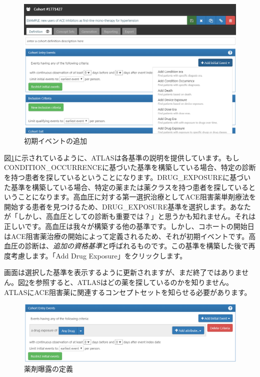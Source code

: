 \documentclass[
  11pt]{book}
\theoremstyle{definition}
\theoremstyle{definition}
\theoremstyle{definition}
\theoremstyle{definition}
\theoremstyle{remark}
\begin{document}
\begin{figure}

{\centering \includegraphics[width=1\linewidth]{images/Cohorts/ATLAS-initialevent} 

}

\caption{初期イベントの追加}\label{fig:ATLASinitialevent}
\end{figure}

図\ref{fig:ATLASinitialevent}に示されているように、ATLASは各基準の説明を提供しています。もしCONDITION\_OCCURRENCEに基づいた基準を構築している場合、特定の診断を持つ患者を探しているということになります。DRUG\_EXPOSUREに基づいた基準を構築している場合、特定の薬または薬クラスを持つ患者を探しているということになります。高血圧に対する第一選択治療としてACE阻害薬単剤療法を開始する患者を見つけるため、DRUG\_EXPOSURE基準を選択します。あなたが「しかし、高血圧としての診断も重要では？」と思うかも知れません。それは正しいです。高血圧は我々が構築する他の基準です。しかし、コホートの開始日はACE阻害薬治療の開始によって定義されるため、それが初期イベントです。高血圧の診断は、\emph{追加の資格基準}と呼ばれるものです。この基準を構築した後で再度考慮します。「Add Drug Exposure」をクリックします。

画面は選択した基準を表示するように更新されますが、まだ終了ではありません。図\ref{fig:ATLASdrugexposure}を参照すると、ATLASはどの薬を探しているのかを知りません。ATLASにACE阻害薬に関連するコンセプトセットを知らせる必要があります。

\begin{figure}

{\centering \includegraphics[width=1\linewidth]{images/Cohorts/ATLAS-drugexposure} 

}

\caption{薬剤曝露の定義}\label{fig:ATLASdrugexposure}
\end{figure}
\end{document}
